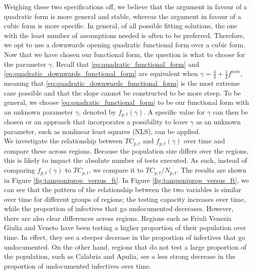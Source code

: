 \documentclass[12pt]{article}
\begin{document}
    Weighing these two specifications off, we believe that the argument in favour of a quadratic form is more general and stable, whereas the argument in favour of a cubic form is more specific. In general, of all possible fitting solutions, the one with the least number of assumptions needed is often to be preferred. Therefore, we opt to use a downwards opening quadratic functional form over a cubic form. Now that we have chosen our functional form, the question is what to choose for the parameter $\gamma$. Recall that \eqref{eq:quadratic_functional_form} and \eqref{eq:quadratic_downwards_functional_form} are equivalent when $\gamma = \frac{3}{4} + \frac{1}{4}f^{min}$, meaning that \eqref{eq:quadratic_downwards_functional_form} is the most extreme case possible and that the slope cannot be constructed to be more steep. To be general, we choose \eqref{eq:quadratic_functional_form} to be our functional form with an unknown parameter $\gamma$, denoted by $f_{p,t}(\gamma)$. A specific value for $\gamma$ can then be chosen or an approach that incorporates a possibility to leave $\gamma$ as an unknown parameter, such as nonlinear least squares (NLS), can be applied. \\
	
	We investigate the relationship between $TC_{p,t}$ and $f_{p,t}(\gamma)$ over time and compare these across regions. Because the population size differs over the regions, this is likely to impact the absolute number of tests executed. As such, instead of comparing $f_{p,t}(\gamma)$ to $TC_{p,t}$, we compare it to $TC_{p,t} / N_{p,t}$. The results are shown in Figure \ref{fig:tamponiprop_versus_ft}. In Figure \ref{fig:tamponiprop_versus_ft}, we can see that the pattern of the relationship between the two variables is similar over time for different groups of regions; the testing capacity increases over time, while the proportion of infectives that go undocumented decreases. However, there are also clear differences across regions. Regions such as Friuli Venezia Giulia and Veneto have been testing a higher proportion of their population over time. In effect, they see a steeper decrease in the proportion of infectives that go undocumented. On the other hand, regions that do not test a large proportion of the population, such as Calabria and Apulia, see a less strong decrease in the proportion of undocumented infectives over time.
	
\end{document}
